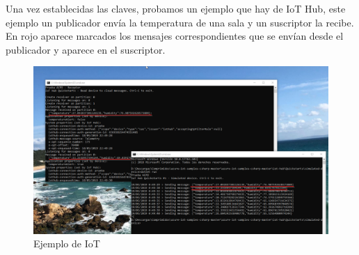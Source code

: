\newpage

Una vez establecidas las claves, probamos un ejemplo que hay de IoT Hub, este ejemplo un publicador envía la temperatura de una sala y un suscriptor la recibe. En rojo aparece marcados los mensajes correspondientes que se envían desde el publicador y aparece en el suscriptor.

\begin{figure}[h]
	\centering
	\includegraphics[scale=0.4]{iot_azure/mensajes.png}
	\caption{Ejemplo de IoT}
	\label{AZIOT7}
\end{figure}

